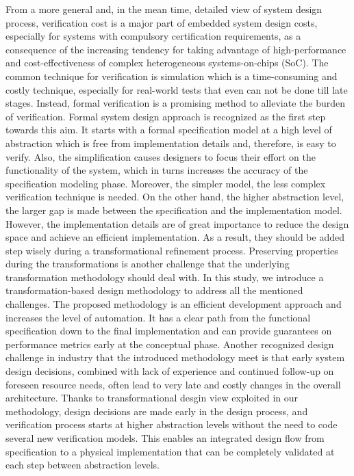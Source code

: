 From a more general and, in the mean time, detailed view of system design process,  verification  cost  is  a  major  part  of  embedded system design costs, especially for systems with compulsory certification requirements, as a consequence of the increasing  tendency  for  taking  advantage  of  high-performance  and  cost-effectiveness  of  complex  heterogeneous  systems-on-chips  (SoC).  The  common technique  for  verification  is  simulation  which  is  a time-consuming  and  costly  technique, especially for real-world tests that even can not be done till late stages.  Instead,  formal  verification  is  a  promising  method  to  alleviate the burden  of  verification.  Formal  system  design  approach is  recognized  as  the  first  step towards this  aim.    It  starts  with  a formal  specification model at  a  high  level  of  abstraction  which  is free from implementation details and, therefore, is easy to verify.  Also, the simplification causes designers to focus their effort on the functionality of the  system,  which  in  turns  increases  the  accuracy  of the specification modeling phase.  Moreover, the simpler model, the less complex verification technique is needed.  On the  other hand,  the higher  abstraction level, the larger gap is made between the specification and  the  implementation  model.  However,  the  implementation details are of great importance to reduce the design space and achieve an efficient implementation.  As a result, they should be added step wisely during a transformational  refinement  process. 
Preserving properties during the transformations is another challenge that the underlying transformation methodology should deal with. In this study, we introduce a transformation-based design methodology  to address all the mentioned challenges. The proposed methodology is an efficient development approach and increases the level of automation. It has a clear path from the functional specification down to the final implementation and can provide guarantees on performance metrics early at the conceptual phase. Another recognized design challenge in industry that the introduced methodology meet is that early system design decisions, combined with lack of experience and continued follow-up on foreseen resource needs, often lead to very late and costly changes in the overall architecture. Thanks to transformational desgin view exploited in our methodology, design decisions are made early in the design process, and verification process starts at higher abstraction levels without the need to code several new verification models. This enables an integrated design flow from specification to a physical implementation that can be completely validated at each step between abstraction levels.




